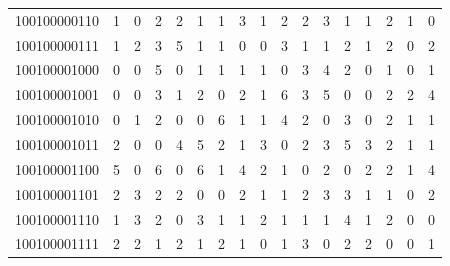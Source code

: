 \documentclass[10pt,a4paper]{article}
\begin{document}
\begin{longtable}{ |c|c|c|c|c|c|c|c|c|c|c|c|c|c|c|c|c| }
    100100000110              & 1                            & 0                                & 2                            & 2                              & 1   & 1   & 3   & 1   & 2   & 2   & 3   & 1   & 1   & 2   & 1   & 0   \\
    100100000111              & 1                            & 2                                & 3                            & 5                              & 1   & 1   & 0   & 0   & 3   & 1   & 1   & 2   & 1   & 2   & 0   & 2   \\
    100100001000              & 0                            & 0                                & 5                            & 0                              & 1   & 1   & 1   & 1   & 0   & 3   & 4   & 2   & 0   & 1   & 0   & 1   \\
    100100001001              & 0                            & 0                                & 3                            & 1                              & 2   & 0   & 2   & 1   & 6   & 3   & 5   & 0   & 0   & 2   & 2   & 4   \\
    100100001010              & 0                            & 1                                & 2                            & 0                              & 0   & 6   & 1   & 1   & 4   & 2   & 0   & 3   & 0   & 2   & 1   & 1   \\
    100100001011              & 2                            & 0                                & 0                            & 4                              & 5   & 2   & 1   & 3   & 0   & 2   & 3   & 5   & 3   & 2   & 1   & 1   \\
    100100001100              & 5                            & 0                                & 6                            & 0                              & 6   & 1   & 4   & 2   & 1   & 0   & 2   & 0   & 2   & 2   & 1   & 4   \\
    100100001101              & 2                            & 3                                & 2                            & 2                              & 0   & 0   & 2   & 1   & 1   & 2   & 3   & 3   & 1   & 1   & 0   & 2   \\
    100100001110              & 1                            & 3                                & 2                            & 0                              & 3   & 1   & 1   & 2   & 1   & 1   & 1   & 4   & 1   & 2   & 0   & 0   \\
    100100001111              & 2                            & 2                                & 1                            & 2                              & 1   & 2   & 1   & 0   & 1   & 3   & 0   & 2   & 2   & 0   & 0   & 1   \\

\end{longtable}
\end{document}
